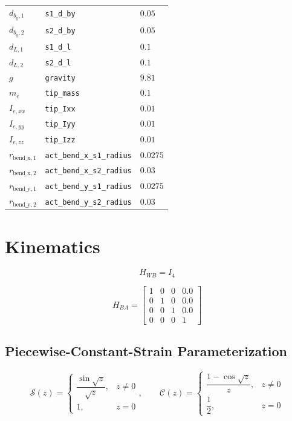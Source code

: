 \documentclass[11pt]{article}
\newcommand{\Sfun}{\mathcal{S}}
\newcommand{\Cfun}{\mathcal{C}}
\begin{document}
\begin{longtable}{lll}
$d_{b_y,1}$ & \texttt{s1\_d\_by} & $0.05$ \\
$d_{b_y,2}$ & \texttt{s2\_d\_by} & $0.05$ \\
$d_{L,1}$ & \texttt{s1\_d\_l} & $0.1$ \\
$d_{L,2}$ & \texttt{s2\_d\_l} & $0.1$ \\
$g$ & \texttt{gravity} & $9.81$ \\
$m_e$ & \texttt{tip\_mass} & $0.1$ \\
$I_{e,xx}$ & \texttt{tip\_Ixx} & $0.01$ \\
$I_{e,yy}$ & \texttt{tip\_Iyy} & $0.01$ \\
$I_{e,zz}$ & \texttt{tip\_Izz} & $0.01$ \\
$r_{\mathrm{bend\_x},1}$ & \texttt{act\_bend\_x\_s1\_radius} & $0.0275$ \\
$r_{\mathrm{bend\_x},2}$ & \texttt{act\_bend\_x\_s2\_radius} & $0.03$ \\
$r_{\mathrm{bend\_y},1}$ & \texttt{act\_bend\_y\_s1\_radius} & $0.0275$ \\
$r_{\mathrm{bend\_y},2}$ & \texttt{act\_bend\_y\_s2\_radius} & $0.03$ \\
\hline
\end{longtable}

\section{Kinematics}
\begin{equation}
H_{WB}=I_4
\end{equation}

\begin{equation}
H_{BA}=\begin{bmatrix}1 & 0 & 0 & 0.0\\0 & 1 & 0 & 0.0\\0 & 0 & 1 & 0.0\\0 & 0 & 0 & 1\end{bmatrix}\label{eq:mount-transform}
\end{equation}

\subsection{Piecewise-Constant-Strain Parameterization}
\begin{equation}
\Sfun(z)=\begin{cases}\dfrac{\sin\sqrt z}{\sqrt z},&z\ne0\\1,&z=0\end{cases},\qquad \Cfun(z)=\begin{cases}\dfrac{1-\cos\sqrt z}{z},&z\ne0\\\dfrac12,&z=0\end{cases}
\end{equation}
\end{document}
